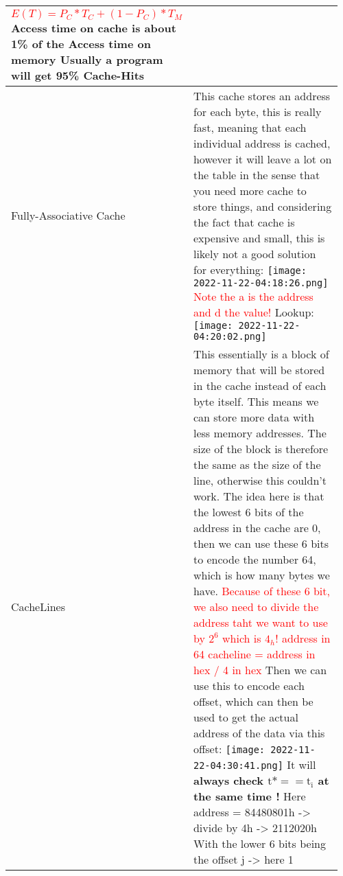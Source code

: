 \documentclass[main.tex,fontsize=8pt,paper=a4,paper=portrait,DIV=calc,]{scrartcl}
\begin{document}
\begin{table}[ht!]
\begin{tabular}{|m{0.2\linewidth}|m{0.755\linewidth}|}
\textcolor{red}{\(E(T) = P_C * T_C + (1 - P_C )* T_M\)}\newline
\textcolor{OliveGreen}{Access time on cache is about 1\% of the Access time on memory}\newline
\textcolor{OliveGreen}{Usually a program will get 95\% Cache-Hits}\\
\hline
Fully-Associative Cache & 
This cache stores an address for each byte, this is really fast, meaning that each individual address is cached, however it will leave a lot on the table in the sense that you need more cache to store things, and considering the fact that cache is expensive and small, this is likely not a good solution for everything:\newline
\texttt{[image: 2022-11-22-04:18:26.png]}\newline
\textcolor{red}{Note the a is the address and d the value!}\newline
Lookup:\newline
\texttt{[image: 2022-11-22-04:20:02.png]}\\
\hline
CacheLines & 
This essentially is a block of memory that will be stored in the cache instead of each byte itself. This means we can store more data with less memory addresses.\newline
The size of the block is therefore the same as the size of the line, otherwise this couldn't work.\newline
\textcolor{OliveGreen}{The idea here is that the lowest 6 bits of the address in the cache are 0, then we can use these 6 bits to encode the number 64, which is how many bytes we have.\newline 
  \textcolor{red}{Because of these 6 bit, we also need to divide the address taht we want to use by \(2^6\) which is \(4_h\)!\newline
  address in 64 cacheline = address in hex / 4 in hex}\newline
Then we can use this to encode each offset, which can then be used to get the actual address of the data via this offset:}\newline
\texttt{[image: 2022-11-22-04:30:41.png]}\newline
It will \textbf{always check \(\text{t*} == \text{t}_\text{i}\) at the same time !}\newline
Here address = 84480801h -> divide by 4h -> 2112020h\newline
With the lower 6 bits being the offset j -> here 1\newline

\end{tabular}
\end{table}
\end{document}
